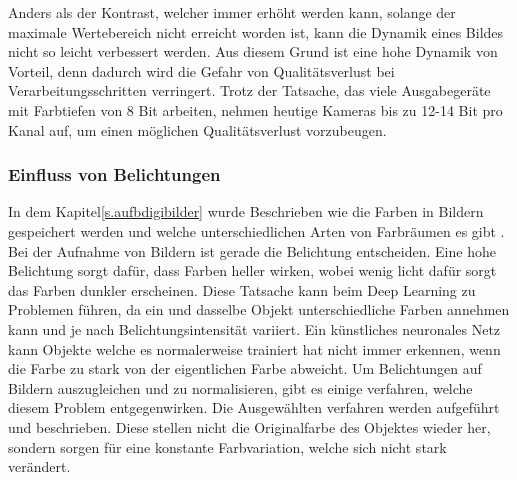 \documentclass[a4paper,12pt,oneside]{article}
\begin{document}
Anders als der Kontrast, welcher immer erhöht werden kann, solange der maximale Wertebereich nicht erreicht worden ist, kann die Dynamik eines Bildes nicht so leicht verbessert werden. Aus diesem Grund ist eine hohe Dynamik von Vorteil, denn dadurch wird die Gefahr von Qualitätsverlust bei Verarbeitungsschritten verringert. Trotz der Tatsache, das viele Ausgabegeräte mit Farbtiefen von 8 Bit arbeiten, nehmen heutige Kameras bis zu 12-14 Bit pro Kanal auf, um einen möglichen Qualitätsverlust vorzubeugen.
  \subsubsection{Einfluss von Belichtungen}\label{s.belichtung}
In dem Kapitel\ref{s.aufbdigibilder} wurde Beschrieben wie die Farben in Bildern gespeichert werden und welche unterschiedlichen Arten von Farbräumen es gibt \cite[41ff.]{burger2009digitale}. Bei der Aufnahme von Bildern ist gerade die Belichtung entscheiden. Eine hohe Belichtung sorgt dafür, dass Farben heller wirken, wobei wenig licht dafür sorgt das Farben dunkler erscheinen. Diese Tatsache kann beim Deep Learning zu Problemen führen, da ein und dasselbe Objekt unterschiedliche Farben annehmen kann und je nach Belichtungsintensität variiert. Ein künstliches neuronales Netz kann Objekte welche es normalerweise trainiert hat nicht immer erkennen, wenn die Farbe zu stark von der eigentlichen Farbe abweicht. Um Belichtungen auf Bildern auszugleichen und zu normalisieren, gibt es einige verfahren, welche diesem Problem entgegenwirken. Die Ausgewählten verfahren werden aufgeführt und beschrieben. Diese stellen nicht die Originalfarbe des Objektes wieder her, sondern sorgen für eine konstante Farbvariation, welche sich nicht stark verändert.
\end{document}
